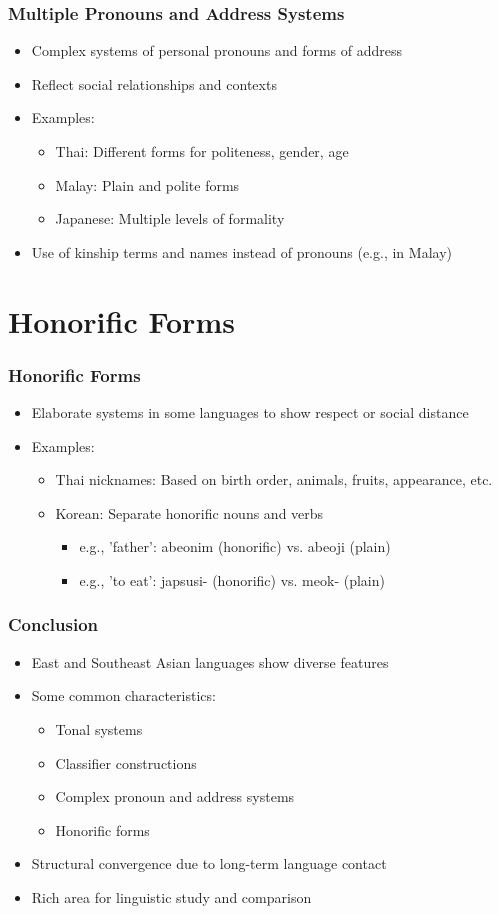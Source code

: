 \documentclass{beamer}
\begin{document}
\begin{frame}
\frametitle{Multiple Pronouns and Address Systems}
\begin{itemize}
\item Complex systems of personal pronouns and forms of address
\item Reflect social relationships and contexts
\item Examples:
  \begin{itemize}
  \item Thai: Different forms for politeness, gender, age
  \item Malay: Plain and polite forms
  \item Japanese: Multiple levels of formality
  \end{itemize}
\item Use of kinship terms and names instead of pronouns (e.g., in Malay)
\end{itemize}
\end{frame}

\section{Honorific Forms}

\begin{frame}
\frametitle{Honorific Forms}
\begin{itemize}
\item Elaborate systems in some languages to show respect or social distance
\item Examples:
  \begin{itemize}
  \item Thai nicknames: Based on birth order, animals, fruits, appearance, etc.
  \item Korean: Separate honorific nouns and verbs
    \begin{itemize}
    \item e.g., 'father': abeonim (honorific) vs. abeoji (plain)
    \item e.g., 'to eat': japsusi- (honorific) vs. meok- (plain)
    \end{itemize} 
  \end{itemize}
\end{itemize}
\end{frame}

\begin{frame}
\frametitle{Conclusion}
\begin{itemize}
\item East and Southeast Asian languages show diverse features
\item Some common characteristics:
  \begin{itemize}
  \item Tonal systems
  \item Classifier constructions
  \item Complex pronoun and address systems
  \item Honorific forms
  \end{itemize}
\item Structural convergence due to long-term language contact
\item Rich area for linguistic study and comparison
\end{itemize}
\end{frame}
\end{document}
